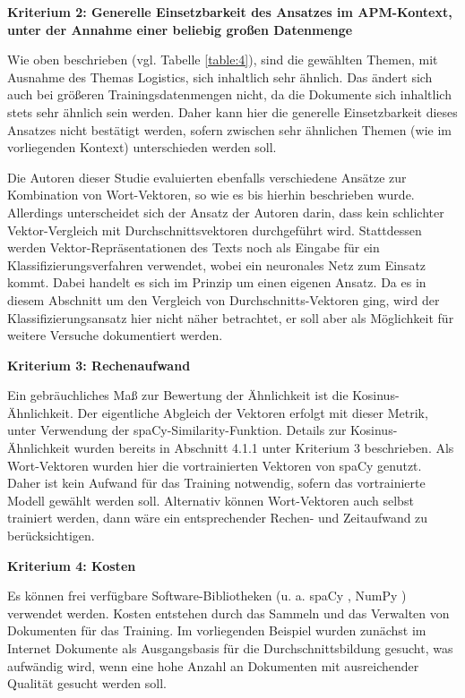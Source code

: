 {\bf Kriterium 2: Generelle Einsetzbarkeit des Ansatzes im APM-Kontext, unter der Annahme einer beliebig großen Datenmenge}

Wie oben beschrieben (vgl. Tabelle \ref{table:4}), sind die gewählten Themen, mit Ausnahme des Themas Logistics, sich inhaltlich sehr ähnlich. Das ändert sich auch bei größeren Trainingsdatenmengen nicht, da die Dokumente sich inhaltlich stets sehr ähnlich sein werden. Daher kann hier die generelle Einsetzbarkeit dieses Ansatzes nicht bestätigt werden, sofern zwischen sehr ähnlichen Themen (wie im vorliegenden Kontext) unterschieden werden soll.

Die Autoren dieser Studie \cite{dilawar} evaluierten ebenfalls verschiedene Ansätze zur Kombination von Wort-Vektoren, so wie es bis hierhin beschrieben wurde. Allerdings unterscheidet sich der Ansatz der Autoren darin, dass kein schlichter Vektor-Vergleich mit Durchschnittsvektoren durchgeführt wird. Stattdessen werden Vektor-Repräsentationen des Texts noch als Eingabe für ein Klassifizierungsverfahren verwendet, wobei ein neuronales Netz zum Einsatz kommt. Dabei handelt es sich im Prinzip um einen eigenen Ansatz. Da es in diesem Abschnitt um den Vergleich von Durchschnitts-Vektoren ging, wird der Klassifizierungsansatz hier nicht näher betrachtet, er soll aber als Möglichkeit für weitere Versuche dokumentiert werden.


{\bf Kriterium 3: Rechenaufwand}

Ein gebräuchliches Maß zur Bewertung der Ähnlichkeit ist die Kosinus-Ähnlichkeit. Der eigentliche Abgleich der Vektoren erfolgt mit dieser Metrik, unter Verwendung der spaCy-Similarity-Funktion. Details zur Kosinus-Ähnlichkeit wurden bereits in Abschnitt 4.1.1 unter Kriterium 3 beschrieben. Als Wort-Vektoren wurden hier die vortrainierten Vektoren von spaCy genutzt. Daher ist kein Aufwand für das Training notwendig, sofern das vortrainierte Modell gewählt werden soll. Alternativ können Wort-Vektoren auch selbst trainiert werden, dann wäre ein entsprechender Rechen- und Zeitaufwand zu berücksichtigen.

{\bf Kriterium 4: Kosten}

Es können frei verfügbare Software-Bibliotheken (u. a. spaCy \cite{spacy-license}, NumPy \cite{numpy-license}) verwendet werden. Kosten entstehen durch das Sammeln und das Verwalten von Dokumenten für das Training. Im vorliegenden Beispiel wurden zunächst im Internet Dokumente als Ausgangsbasis für die Durchschnittsbildung gesucht, was aufwändig wird, wenn eine hohe Anzahl an Dokumenten mit ausreichender Qualität gesucht werden soll.

